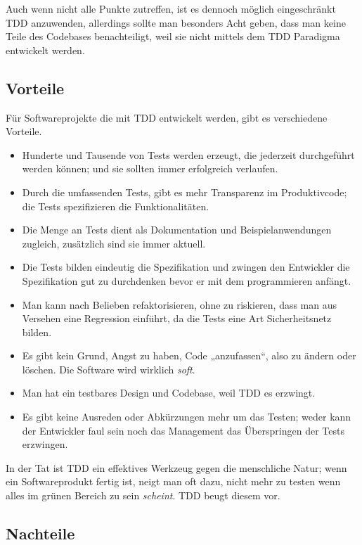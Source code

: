 \documentclass[a4paper,10pt]{scrartcl}
\begin{document}
Auch wenn nicht alle Punkte zutreffen, ist es dennoch möglich eingeschränkt TDD
anzuwenden, allerdings sollte man besonders Acht geben, dass man keine Teile
des Codebases benachteiligt, weil sie nicht mittels dem TDD Paradigma
entwickelt werden.

\subsection{Vorteile}\label{sec:Vorteile}

Für Softwareprojekte die mit TDD entwickelt werden, gibt es verschiedene
Vorteile.

\begin{itemize}
    \item Hunderte und Tausende von Tests werden erzeugt, die jederzeit
        durchgeführt werden können; und sie sollten immer erfolgreich
        verlaufen.
    \item Durch die umfassenden Tests, gibt es mehr Transparenz im
        Produktivcode; die Tests spezifizieren die Funktionalitäten.
    \item Die Menge an Tests dient als Dokumentation und Beispielanwendungen
        zugleich, zusätzlich sind sie immer aktuell.
    \item Die Tests bilden eindeutig die Spezifikation und zwingen den
        Entwickler die Spezifikation gut zu durchdenken bevor er mit dem
        programmieren anfängt.
    \item Man kann nach Belieben refaktorisieren, ohne zu riskieren, dass man
        aus Versehen eine Regression einführt, da die Tests eine Art
        Sicherheitsnetz bilden.
    \item Es gibt kein Grund, Angst zu haben, Code „anzufassen“, also zu ändern
        oder löschen. Die Software wird wirklich \emph{soft}. \cite{UncleBob}
    \item Man hat ein testbares Design und Codebase, weil TDD es erzwingt.
    \item Es gibt keine Ausreden oder Abkürzungen mehr um das Testen; weder
        kann der Entwickler faul sein noch das Management das Überspringen der
        Tests erzwingen.
\end{itemize}

In der Tat ist TDD ein effektives Werkzeug gegen die menschliche Natur; wenn
ein Softwareprodukt fertig ist, neigt man oft dazu, nicht mehr zu testen wenn
alles im grünen Bereich zu sein \emph{scheint}. TDD beugt diesem vor.

\subsection{Nachteile}\label{sec:Nachteile}
\end{document}
